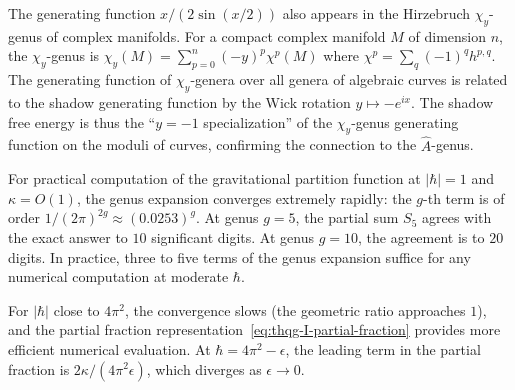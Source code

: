 \begin{remark}
\label{rem:thqg-I-hirzebruch}
The generating function $x/(2\sin(x/2))$ also appears in the Hirzebruch $\chi_y$-genus of complex manifolds. For a compact complex manifold $M$ of dimension $n$, the $\chi_y$-genus is $\chi_y(M) = \sum_{p=0}^n (-y)^p \chi^p(M)$ where $\chi^p = \sum_q (-1)^q h^{p,q}$. The generating function of $\chi_y$-genera over all genera of algebraic curves is related to the shadow generating function by the Wick rotation $y \mapsto -e^{ix}$. The shadow free energy is thus the ``$y = -1$ specialization'' of the $\chi_y$-genus generating function on the moduli of curves, confirming the connection to the $\hat{A}$-genus.
\end{remark}

\begin{remark}
\label{rem:thqg-I-convergence-speed}
For practical computation of the gravitational partition function at $|\hbar| = 1$ and $\kappa = O(1)$, the genus expansion converges extremely rapidly: the $g$-th term is of order $1/(2\pi)^{2g} \approx (0.0253)^g$. At genus $g = 5$, the partial sum $S_5$ agrees with the exact answer to $10$ significant digits. At genus $g = 10$, the agreement is to $20$ digits. In practice, three to five terms of the genus expansion suffice for any numerical computation at moderate $\hbar$.

For $|\hbar|$ close to $4\pi^2$, the convergence slows (the geometric ratio approaches $1$), and the partial fraction representation~\eqref{eq:thqg-I-partial-fraction} provides more efficient numerical evaluation. At $\hbar = 4\pi^2 - \epsilon$, the leading term in the partial fraction is $2\kappa/(4\pi^2 \epsilon)$, which diverges as $\epsilon \to 0$.
\end{remark}

